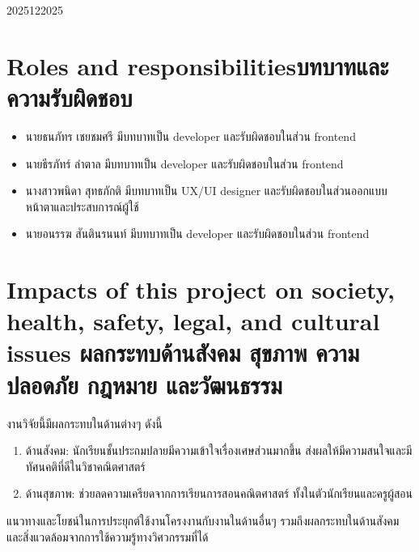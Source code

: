 \begin{plan}{6}{2025}{12}{2025}
\end{plan}

\section{\ifenglish Roles and responsibilities\else บทบาทและความรับผิดชอบ\fi}
\begin{itemize}
    \item นายธนภัทร เชยชมศรี มีบทบาทเป็น developer และรับผิดชอบในส่วน frontend
    \item นายธีรภัทร์ ลําตาล มีบทบาทเป็น developer และรับผิดชอบในส่วน frontend
    \item นางสาวพนิดา สุทธภักติ มีบทบาทเป็น UX/UI designer และรับผิดชอบในส่วนออกแบบหน้าตาและประสบการณ์ผู้ใช้
    \item นายอนรรฆ สันตินรนนท์ มีบทบาทเป็น developer และรับผิดชอบในส่วน frontend
\end{itemize}

\section{\ifenglish%
Impacts of this project on society, health, safety, legal, and cultural issues
\else%
ผลกระทบด้านสังคม สุขภาพ ความปลอดภัย กฎหมาย และวัฒนธรรม
\fi}
งานวิจัยนี้มีผลกระทบในด้านต่างๆ ดังนี้
\begin{enumerate}
    \item ด้านสังคม: นักเรียนชั้นประถมปลายมีความเข้าใจเรื่องเศษส่วนมากขึ้น ส่งผลให้มีความสนใจและมี\\
    ทัศนคติที่ดีในวิชาคณิตศาสตร์
    \item ด้านสุขภาพ: ช่วยลดความเครียดจากการเรียนการสอนคณิตศาสตร์ ทั้งในตัวนักเรียนและครูผู้สอน
\end{enumerate}

แนวทางและโยชน์ในการประยุกต์ใช้งานโครงงานกับงานในด้านอื่นๆ รวมถึงผลกระทบในด้านสังคมและสิ่งแวดล้อมจากการใช้ความรู้ทางวิศวกรรมที่ได้
